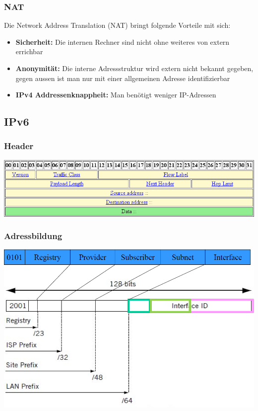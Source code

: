 \subsubsection{NAT}

Die Network Address Translation (NAT) bringt folgende Vorteile mit sich:

\begin{itemize}
	\item \textbf{Sicherheit:} Die internen Rechner sind nicht ohne weiteres von
		extern errichbar
	\item \textbf{Anonymität:} Die interne Adressstruktur wird extern nicht
		bekannt gegeben, gegen aussen ist man nur mit einer allgemeinen Adresse
		identifizierbar
	\item \textbf{IPv4 Addressenknappheit:} Man benötigt weniger IP-Adressen
\end{itemize}


\subsection{IPv6}

\subsubsection{Header}

\includegraphics[width=\textwidth]{media/ipv6_header.png}

\subsubsection{Adressbildung}

\includegraphics[width=\textwidth]{media/ipv6.png}

